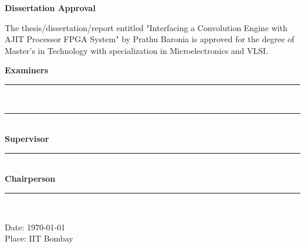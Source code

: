 \thispagestyle{empty}

\begin{center}
{\Large \textbf{Dissertation Approval}}%
\end{center}

\setlength{\parindent}{0em}
The thesis/dissertation/report entitled "Interfacing a Convolution Engine with AJIT Processor FPGA System" by Prathu Baronia is approved for the degree of
Master's in Technology with specialization in Microelectronics and VLSI.

\begin{flushright}
\textbf{Examiners} \\
\vspace{1.5cm}
\rule{8cm}{.4pt}\\
\vspace{1.5cm}
\rule{8cm}{.4pt}\\
\vspace{1.5cm}
\textbf{Supervisor} \\
\vspace{1.5cm}
\rule{8cm}{.4pt}\\
\vspace{1.5cm}
\textbf{Chairperson} \\
\vspace{1.5cm}
\rule{8cm}{.4pt}\\
\vspace{2cm}
\end{flushright}

\begin{flushleft}
Date: \today\\
Place: IIT Bombay\\
\end{flushleft}

\afterpage{\blankpage}
\clearpage
